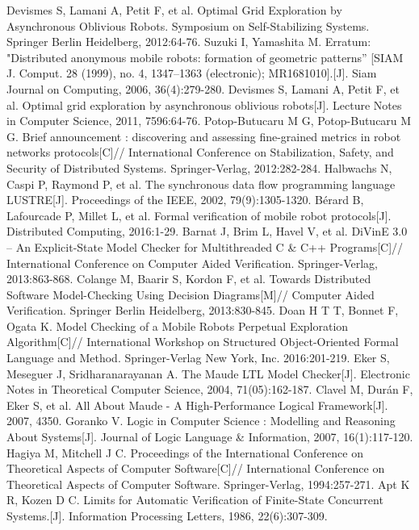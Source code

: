\begin{thebibliography}{0}
   Devismes S, Lamani A, Petit F, et al. Optimal Grid Exploration by Asynchronous Oblivious Robots. Symposium on Self-Stabilizing Systems. Springer Berlin Heidelberg, 2012:64-76.
   Suzuki I, Yamashita M. Erratum: "Distributed anonymous mobile robots: formation of geometric patterns'' [SIAM J. Comput. 28 (1999), no. 4, 1347–1363 (electronic); MR1681010].[J]. Siam Journal on Computing, 2006, 36(4):279-280.
   Devismes S, Lamani A, Petit F, et al. Optimal grid exploration by asynchronous oblivious robots[J]. Lecture Notes in Computer Science, 2011, 7596:64-76.
   Potop-Butucaru M G, Potop-Butucaru M G. Brief announcement : discovering and assessing fine-grained metrics in robot networks protocols[C]// International Conference on Stabilization, Safety, and Security of Distributed Systems. Springer-Verlag, 2012:282-284.
   Halbwachs N, Caspi P, Raymond P, et al. The synchronous data flow programming language LUSTRE[J]. Proceedings of the IEEE, 2002, 79(9):1305-1320.
   Bérard B, Lafourcade P, Millet L, et al. Formal verification of mobile robot protocols[J]. Distributed Computing, 2016:1-29.
   Barnat J, Brim L, Havel V, et al. DiVinE 3.0 – An Explicit-State Model Checker for Multithreaded C & C++ Programs[C]// International Conference on Computer Aided Verification. Springer-Verlag, 2013:863-868.
   Colange M, Baarir S, Kordon F, et al. Towards Distributed Software Model-Checking Using Decision Diagrams[M]// Computer Aided Verification. Springer Berlin Heidelberg, 2013:830-845.
   Doan H T T, Bonnet F, Ogata K. Model Checking of a Mobile Robots Perpetual Exploration Algorithm[C]// International Workshop on Structured Object-Oriented Formal Language and Method. Springer-Verlag New York, Inc. 2016:201-219.
   Eker S, Meseguer J, Sridharanarayanan A. The Maude LTL Model Checker[J]. Electronic Notes in Theoretical Computer Science, 2004, 71(05):162-187.
   Clavel M, Durán F, Eker S, et al. All About Maude - A High-Performance Logical Framework[J]. 2007, 4350.
   Goranko V. Logic in Computer Science : Modelling and Reasoning About Systems[J]. Journal of Logic Language & Information, 2007, 16(1):117-120.
   Hagiya M, Mitchell J C. Proceedings of the International Conference on Theoretical Aspects of Computer Software[C]// International Conference on Theoretical Aspects of Computer Software. Springer-Verlag, 1994:257-271.
   Apt K R, Kozen D C. Limits for Automatic Verification of Finite-State Concurrent Systems.[J]. Information Processing Letters, 1986, 22(6):307-309.

\end{thebibliography}
